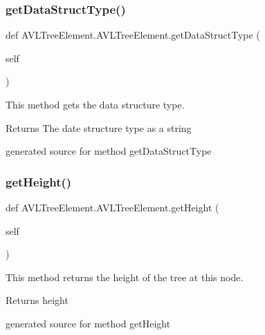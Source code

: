 \subsubsection{\texorpdfstring{get\+Data\+Struct\+Type()}{getDataStructType()}}
{\footnotesize\ttfamily def A\+V\+L\+Tree\+Element.\+A\+V\+L\+Tree\+Element.\+get\+Data\+Struct\+Type (\begin{DoxyParamCaption}\item[{}]{self }\end{DoxyParamCaption})}



This method gets the data structure type. 

\begin{DoxyReturn}{Returns}
The date structure type as a string\begin{DoxyVerb}generated source for method getDataStructType \end{DoxyVerb}
 
\end{DoxyReturn}
\hypertarget{class_a_v_l_tree_element_1_1_a_v_l_tree_element_a6e03fb5147748af1b465285787d5a780}{}\label{class_a_v_l_tree_element_1_1_a_v_l_tree_element_a6e03fb5147748af1b465285787d5a780} 
\subsubsection{\texorpdfstring{get\+Height()}{getHeight()}}
{\footnotesize\ttfamily def A\+V\+L\+Tree\+Element.\+A\+V\+L\+Tree\+Element.\+get\+Height (\begin{DoxyParamCaption}\item[{}]{self }\end{DoxyParamCaption})}



This method returns the height of the tree at this node. 

\begin{DoxyReturn}{Returns}
height\begin{DoxyVerb}generated source for method getHeight \end{DoxyVerb}
 
\end{DoxyReturn}
\hypertarget{class_a_v_l_tree_element_1_1_a_v_l_tree_element_a21513833c84670f79d8022300f1546e0}{}\label{class_a_v_l_tree_element_1_1_a_v_l_tree_element_a21513833c84670f79d8022300f1546e0} 
